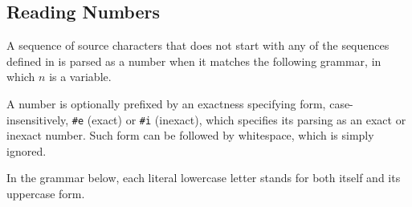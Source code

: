 \pagebreak 




\subsection{Reading Numbers}
\label{subsec:aml-base-lang-reader-numbers}

A sequence of source characters that does not start with any of the sequences defined in  is parsed as a number when it matches the following grammar, in which $n$ is a variable.

A number is optionally prefixed by an exactness specifying form, case-insensitively, \lstinline!#e! (exact) or \lstinline!#i! (inexact), which specifies its parsing as an exact or inexact number. Such form can be followed by whitespace, which is simply ignored.


In the grammar below, each literal lowercase letter stands for both itself and its uppercase form.


